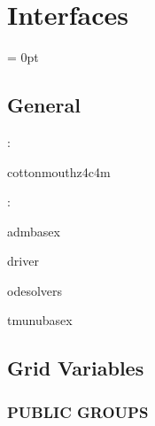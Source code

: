 
\section{Interfaces} 


\parskip = 0pt

\vspace{3mm} \subsection*{General}

: 

cottonmouthz4c4m
\vspace{2mm}

: 

admbasex

driver

odesolvers

tmunubasex
\vspace{2mm}
\subsection*{Grid Variables}
\vspace{5mm}\subsubsection{PUBLIC GROUPS}

\vspace{5mm}

